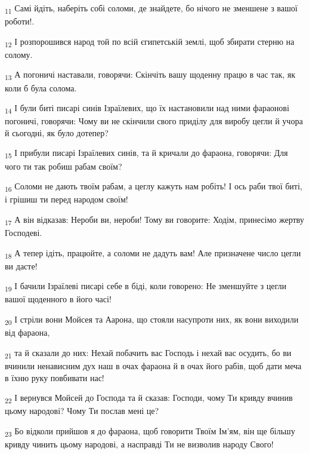 \begin{tcolorbox}
\textsubscript{11} Самі йдіть, наберіть собі соломи, де знайдете, бо нічого не зменшене з вашої роботи!.
\end{tcolorbox}
\begin{tcolorbox}
\textsubscript{12} І розпорошився народ той по всій єгипетській землі, щоб збирати стерню на солому.
\end{tcolorbox}
\begin{tcolorbox}
\textsubscript{13} А погоничі наставали, говорячи: Скінчіть вашу щоденну працю в час так, як коли б була солома.
\end{tcolorbox}
\begin{tcolorbox}
\textsubscript{14} І були биті писарі синів Ізраїлевих, що їх настановили над ними фараонові погоничі, говорячи: Чому ви не скінчили свого приділу для виробу цегли й учора й сьогодні, як було дотепер?
\end{tcolorbox}
\begin{tcolorbox}
\textsubscript{15} І прибули писарі Ізраїлевих синів, та й кричали до фараона, говорячи: Для чого ти так робиш рабам своїм?
\end{tcolorbox}
\begin{tcolorbox}
\textsubscript{16} Соломи не дають твоїм рабам, а цеглу кажуть нам робіть! І ось раби твої биті, і грішиш ти перед народом своїм!
\end{tcolorbox}
\begin{tcolorbox}
\textsubscript{17} А він відказав: Нероби ви, нероби! Тому ви говорите: Ходім, принесімо жертву Господеві.
\end{tcolorbox}
\begin{tcolorbox}
\textsubscript{18} А тепер ідіть, працюйте, а соломи не дадуть вам! Але призначене число цегли ви дасте!
\end{tcolorbox}
\begin{tcolorbox}
\textsubscript{19} І бачили Ізраїлеві писарі себе в біді, коли говорено: Не зменшуйте з цегли вашої щоденного в його часі!
\end{tcolorbox}
\begin{tcolorbox}
\textsubscript{20} І стріли вони Мойсея та Аарона, що стояли насупроти них, як вони виходили від фараона,
\end{tcolorbox}
\begin{tcolorbox}
\textsubscript{21} та й сказали до них: Нехай побачить вас Господь і нехай вас осудить, бо ви вчинили ненависним дух наш в очах фараона й в очах його рабів, щоб дати меча в їхню руку повбивати нас!
\end{tcolorbox}
\begin{tcolorbox}
\textsubscript{22} І вернувся Мойсей до Господа та й сказав: Господи, чому Ти кривду вчинив цьому народові? Чому Ти послав мені це?
\end{tcolorbox}
\begin{tcolorbox}
\textsubscript{23} Бо відколи прийшов я до фараона, щоб говорити Твоїм Ім'ям, він ще більшу кривду чинить цьому народові, а насправді Ти не визволив народу Свого!
\end{tcolorbox}
